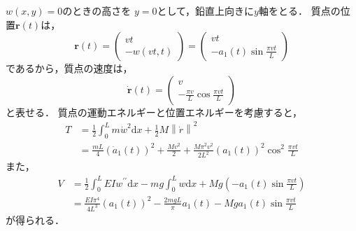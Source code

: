 \documentclass[a4paper]{jsarticle}
\begin{document}
\subsubsection{}
$w(x, y) = 0$のときの高さを
$y = 0$として，鉛直上向きに$y$軸をとる．
質点の位置$\boldsymbol{r}(t)$は，
\begin{equation}
  \boldsymbol{r}(t) =
  \begin{pmatrix}
    vt \\ -w(vt ,t)
  \end{pmatrix} =
  \begin{pmatrix}
    vt \\ -a_1(t) \sin \frac{\pi v t}{L}
  \end{pmatrix}
\end{equation}
であるから，質点の速度は，
\begin{equation}
  \dot{\boldsymbol{r}}(t) =
  \begin{pmatrix}
    v \\ -\frac{\pi v}{L} \cos \frac{\pi v t}{L}
  \end{pmatrix}
\end{equation}
と表せる．
質点の運動エネルギーと位置エネルギーを考慮すると，
\begin{equation}
  \begin{aligned}
    T & = \frac{1}{2} \int_0^L m \dot{w}^2 \mathrm{d} x
    + \frac{1}{2} M \left\| \dot{r} \right\|^2          \\
      & = \frac{mL}{4} \left(\dot{a}_1(t)\right)^2
    + \frac{M v^2}{2}
    + \frac{M \pi^2 v^2}{2 L^2}
    \left(a_1(t)\right)^2 \cos^2 \frac{\pi v t}{L}
  \end{aligned}
\end{equation}
また，
\begin{equation}
  \begin{aligned}
    V & = \frac{1}{2} \int_0^L E I w^{\prime\prime} \mathrm{d} x
    - m g \int_0^L w \mathrm{d} x
    + M g \left(-a_1(t) \sin \frac{\pi v t}{L}\right)            \\
      & = \frac{E I \pi^4}{4 L^3} \left(a_1(t)\right)^2
    - \frac{2 m g L}{\pi} a_1(t)
    - M g a_1(t) \sin \frac{\pi v t} {L}
  \end{aligned}
\end{equation}
が得られる．
\end{document}
